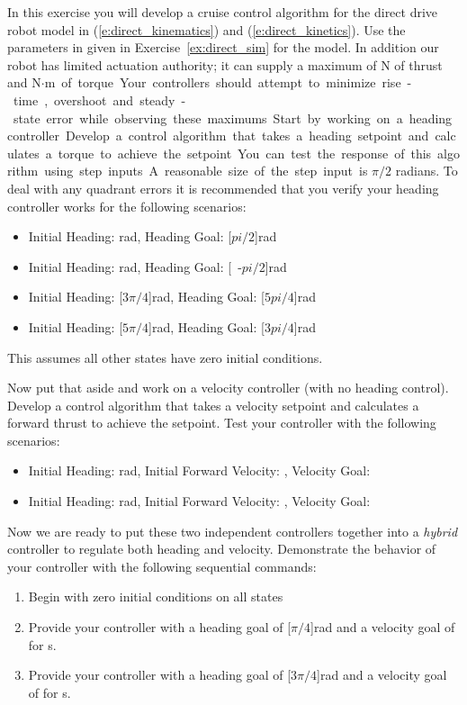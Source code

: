 \begin{ex}
In this exercise you will develop a cruise control algorithm for the direct drive robot model in (\ref{e:direct_kinematics}) and (\ref{e:direct_kinetics}).  Use the parameters in given in Exercise~\ref{ex:direct_sim} for the model.  In addition our robot has limited actuation authority; it can supply a maximum of \unit[10]{N} of thrust and \unit[10]{N$\cdot$m} of torque.  Your controllers should attempt to minimize rise-time, overshoot and steady-state error while observing these maximums.

Start by working on a heading controller.  Develop a control algorithm that takes a heading setpoint and calculates a torque to achieve the setpoint.  You can test the response of this algorithm using step inputs.  A reasonable size of the step input is $\pi/2$ radians.  To deal with any quadrant errors it is recommended that you verify your heading controller works for the following scenarios:
\begin{itemize}
\item Initial Heading: \unit[0]{rad}, Heading Goal: \unit[$pi/2$]{rad}
\item Initial Heading: \unit[0]{rad}, Heading Goal: \unit[-$pi/2$]{rad}
\item Initial Heading: \unit[$3\pi/4$]{rad}, Heading Goal: \unit[$5pi/4$]{rad}
\item Initial Heading: \unit[$5\pi/4$]{rad}, Heading Goal: \unit[$3pi/4$]{rad}
\end{itemize}
This assumes all other states have zero initial conditions.

Now put that aside and work on a velocity controller (with no heading control).  Develop a control algorithm that takes a velocity setpoint and calculates a forward thrust to achieve the setpoint.  Test your controller with the following scenarios:
\begin{itemize}
\item Initial Heading: \unit[0]{rad}, Initial Forward Velocity: , Velocity Goal: 
\item Initial Heading: \unit[0]{rad}, Initial Forward Velocity: , Velocity Goal: 
\end{itemize}

Now we are ready to put these two independent controllers together into a \emph{hybrid} controller to regulate both heading and velocity.  Demonstrate the behavior of your controller with the following sequential commands:
\begin{enumerate}
\item Begin with zero initial conditions on all states
\item Provide your controller with a heading goal of \unit[$\pi/4$]{rad} and a velocity goal of  for \unit[5]{s}.
\item Provide your controller with a heading goal of \unit[$3\pi/4$]{rad} and a velocity goal of  for \unit[5]{s}.
\end{enumerate}


\end{ex}
